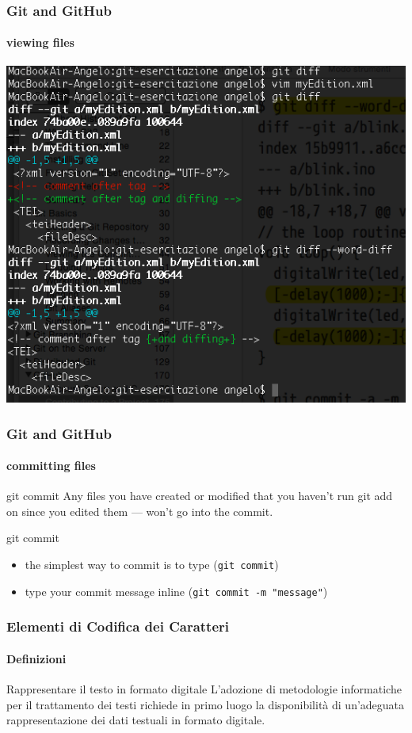 \begin{frame}
	\frametitle{Git and GitHub}
    \framesubtitle{viewing files}
    \addtocounter{nframe}{1}
	
	\begin{center}
		\includegraphics[width=.8\textwidth]{imgs/Diffing-line-word.png}
	\end{center}

\end{frame}

\begin{frame}
	\frametitle{Git and GitHub}
    \framesubtitle{committing files}
    \addtocounter{nframe}{1}

	\begin{block}{git commit}
		Any files you have created or modified that you haven’t run git add on since you edited them — won’t go into the commit.
	\end{block}

	\begin{block}{git commit}
		\begin{itemize}
			\item the simplest way to commit is to type (\texttt{git commit})
			\item type your commit message inline  (\texttt{git commit -m "message"})
		\end{itemize}
	
	\end{block}

\end{frame}

\begin{frame}
	\frametitle{Elementi di Codifica dei Caratteri}
	\framesubtitle{Definizioni}
	\addtocounter{nframe}{1}

	\begin{block}{Rappresentare il testo in formato digitale}
		L’adozione di metodologie informatiche per il trattamento dei testi richiede in primo luogo la disponibilità di un'adeguata rappresentazione dei dati testuali in formato digitale.
	\end{block}

\end{frame}

